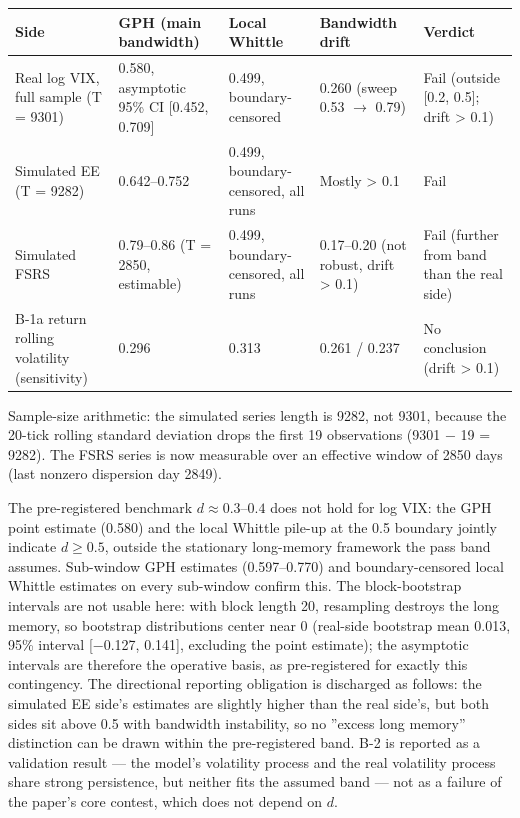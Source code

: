 \documentclass[11pt]{article}
\begin{document}
\begin{table}[htbp]
\centering
\begin{tabular}{lllll}
\toprule
\textbf{Side} & \textbf{GPH (main bandwidth)} & \textbf{Local Whittle} & \textbf{Bandwidth drift} & \textbf{Verdict} \\
\midrule
Real log VIX, full sample (T = 9301) & 0.580, asymptotic 95\% CI [0.452, 0.709] & 0.499, boundary-censored & 0.260 (sweep 0.53 $\rightarrow$ 0.79) & Fail (outside [0.2, 0.5]; drift > 0.1) \\
Simulated EE (T = 9282) & 0.642--0.752 & 0.499, boundary-censored, all runs & Mostly > 0.1 & Fail \\
Simulated FSRS & 0.79--0.86 (T = 2850, estimable) & 0.499, boundary-censored, all runs & 0.17--0.20 (not robust, drift > 0.1) & Fail (further from band than the real side) \\
B-1a return rolling volatility (sensitivity) & 0.296 & 0.313 & 0.261 / 0.237 & No conclusion (drift > 0.1) \\
\bottomrule
\end{tabular}
\end{table}

Sample-size arithmetic: the simulated series length is 9282, not 9301, because the 20-tick rolling standard deviation drops the first 19 observations (9301 $-$ 19 = 9282). The FSRS series is now measurable over an effective window of 2850 days (last nonzero dispersion day 2849).

The pre-registered benchmark $d \approx 0.3$--$0.4$ does not hold for log VIX: the GPH point estimate (0.580) and the local Whittle pile-up at the 0.5 boundary jointly indicate $d \geq 0.5$, outside the stationary long-memory framework the pass band assumes. Sub-window GPH estimates (0.597--0.770) and boundary-censored local Whittle estimates on every sub-window confirm this. The block-bootstrap intervals are not usable here: with block length 20, resampling destroys the long memory, so bootstrap distributions center near 0 (real-side bootstrap mean 0.013, 95\% interval [$-$0.127, 0.141], excluding the point estimate); the asymptotic intervals are therefore the operative basis, as pre-registered for exactly this contingency. The directional reporting obligation is discharged as follows: the simulated EE side's estimates are slightly higher than the real side's, but both sides sit above 0.5 with bandwidth instability, so no ''excess long memory'' distinction can be drawn within the pre-registered band. B-2 is reported as a validation result --- the model's volatility process and the real volatility process share strong persistence, but neither fits the assumed band --- not as a failure of the paper's core contest, which does not depend on $d$.
\end{document}
